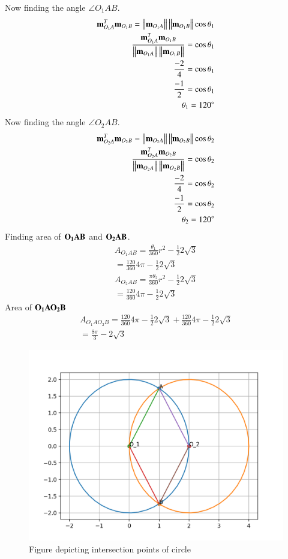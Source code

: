 Now finding the angle $\angle{O_1AB}$.
\begin{align}
    \mathbf{m}_{O_1A}^T \mathbf{m}_{O_1B}=\left\lVert \mathbf{m}_{O_1A}\right\rVert\left\lVert\mathbf{m}_{O_1B}\right\rVert\cos\theta_1\\
    \frac{\mathbf{m}_{O_1A}^T \mathbf{m}_{O_1B}}{\left\lVert \mathbf{m}_{O_1A}\right\rVert\left\lVert\mathbf{m}_{O_1B}\right\rVert}
    =\cos\theta_1\\
     \frac{-2}{4}=\cos\theta_1\\
    \frac{-1}{2}=\cos\theta_1\\
    \theta_1=120^{\circ}
\end{align}
Now finding the angle $\angle{O_2AB}$.
\begin{align}
   \mathbf{m}_{O_2A}^T \mathbf{m}_{O_2B}=\left\lVert \mathbf{m}_{O_2A}\right\rVert\left\lVert\mathbf{m}_{O_2B}\right\rVert\cos\theta_2\\
    \frac{\mathbf{m}_{O_2A}^T \mathbf{m}_{O_2B}}{\left\lVert \mathbf{m}_{O_2A}\right\rVert\left\lVert\mathbf{m}_{O_2B}\right\rVert}
    =\cos\theta_2\\
     \frac{-2}{4}=\cos\theta_2\\
    \frac{-1}{2}=\cos\theta_2\\
    \theta_2=120^{\circ}
\end{align}
Finding area of $\bf{O_1AB}$ and $\bf{O_2AB}$.
 \begin{align}
A_{O_1AB}=\frac{\theta_1}{360}r^2-\frac{1}{2}2\sqrt{3}\\
=\frac{120}{360}4\pi-\frac{1}{2}2\sqrt{3}\\
A_{O_2AB}=\frac{\pi\theta_2}{360}r^2-\frac{1}{2}2\sqrt{3}\\
=\frac{120}{360}4\pi-\frac{1}{2}2\sqrt{3}
\end{align}
Area of  $\bf{O_1AO_2B}$
\begin{align}
A_{O_1AO_2B}=\frac{120}{360}4\pi-\frac{1}{2}2\sqrt{3}+\frac{120}{360}4\pi-\frac{1}{2}2\sqrt{3}\\
=\frac{8\pi}{3}-2\sqrt{3}
\end{align}
  \begin{figure}[h!]
	\centering
	\includegraphics[width=\columnwidth]{./solutions/conics/1/1/Assignment_5.png}
	\caption{Figure depicting intersection points of circle}
	\label{eq:solutions/1/myfig:solutions/1/}
\end{figure}
 
